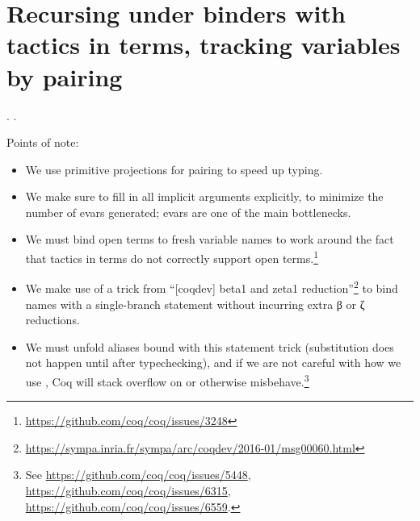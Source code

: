 \begin{coqdoccode}
\end{coqdoccode}
\section{Recursing under binders with tactics in terms, tracking variables by pairing}

\begin{coqdoccode}
\coqdocnoindent
{}  .\coqdoceol
\coqdocnoindent
{}  .\coqdoceol
\coqdocemptyline
\end{coqdoccode}
Points of note:



\begin{itemize}
\item  We use primitive projections for pairing to speed up typing.



\item  We make sure to fill in all implicit arguments explicitly, to
      minimize the number of evars generated; evars are one of the
      main bottlenecks.



\item  We must bind open terms to fresh variable names to work around
      the fact that tactics in terms do not correctly support open
      terms.\footnote{\url{https://github.com/coq/coq/issues/3248}}



\item  We make use of a trick from ``[coqdev] beta1 and zeta1
      reduction''\footnote{\url{https://sympa.inria.fr/sympa/arc/coqdev/2016-01/msg00060.html}}
      to bind names with a single-branch  statement without
      incurring extra β or ζ reductions.



\item  We must unfold aliases bound with this  statement trick
      (substitution does not happen until after typechecking), and if
      we are not careful with how we use , Coq will stack
      overflow on   or otherwise misbehave.\footnote{See
      \url{https://github.com/coq/coq/issues/5448},
      \url{https://github.com/coq/coq/issues/6315},
      \url{https://github.com/coq/coq/issues/6559}.}




\end{itemize}
